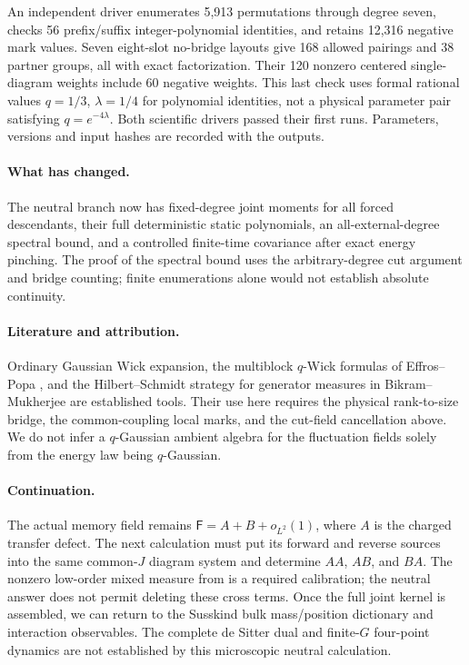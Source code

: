 \documentclass[11pt]{article}
\begin{document}
An independent driver enumerates 5,913 permutations through degree
seven, checks 56 prefix/suffix integer-polynomial identities, and
retains 12,316 negative mark values. Seven eight-slot no-bridge
layouts give 168 allowed pairings and 38 partner groups, all
with exact factorization. Their 120 nonzero centered single-diagram
weights include 60 negative weights. This last check uses formal
rational values $q=1/3$, $\lambda=1/4$ for polynomial identities,
not a physical parameter pair satisfying $q=e^{-4\lambda}$.
Both scientific drivers passed their first runs. Parameters,
versions and input hashes are recorded with the outputs.

\paragraph{What has changed.}
The neutral branch now has fixed-degree joint moments for all
forced descendants, their full deterministic static polynomials,
an all-external-degree spectral bound, and a controlled finite-time
covariance after exact energy pinching. The proof of the spectral
bound uses the arbitrary-degree cut argument and bridge counting;
finite enumerations alone would not establish absolute continuity.

\paragraph{Literature and attribution.}
Ordinary Gaussian Wick expansion, the multiblock $q$-Wick formulas
of Effros--Popa \cite{EP}, and the Hilbert--Schmidt strategy for
generator measures in Bikram--Mukherjee \cite{BM} are established
tools. Their use here requires the physical rank-to-size bridge,
the common-coupling local marks, and the cut-field cancellation
above. We do not infer a $q$-Gaussian ambient algebra for the
fluctuation fields solely from the energy law being $q$-Gaussian.

\paragraph{Continuation.}
The actual memory field remains $\mathsf F=A+B+o_{L^2}(1)$,
where $A$ is the charged transfer defect. The next calculation
must put its forward and reverse sources into the same common-$J$
diagram system and determine $AA$, $AB$, and $BA$. The nonzero
low-order mixed measure from \cite{Two} is a required calibration;
the neutral answer does not permit deleting these cross terms.
Once the full joint kernel is assembled, we can return to the
Susskind bulk mass/position dictionary and interaction observables.
The complete de Sitter dual and finite-$G$ four-point dynamics are
not established by this microscopic neutral calculation.
\end{document}
